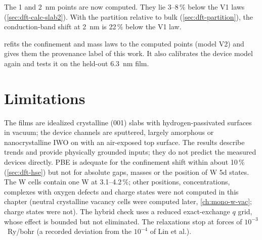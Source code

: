 The 1 and 2~nm points are now computed. They lie 3--8\,\% below the V1 laws (\cref{sec:dft-calc-slab2}). With the
partition relative to bulk (\cref{sec:dft-partition}), the conduction-band shift at 2~nm is 22\,\% below the V1 law.

 refits the confinement and mass laws to the computed points (model V2) and gives them the provenance label
of this work. It also calibrates the device model again and tests it on the held-out 6.3~nm film.

\section{Limitations}
\label{sec:dft-limits}

\begin{caveat}
The films are idealized crystalline (001) slabs with hydrogen-passivated surfaces in vacuum; the device channels are
sputtered, largely amorphous or nanocrystalline IWO on \AlO{} with an air-exposed top surface. The results describe
trends and provide physically grounded inputs; they do not predict the measured devices directly. PBE is adequate for
the confinement shift within about 10\,\% (\cref{sec:dft-hse}) but not for absolute gaps, masses or the position of W 5d
states. The W cells contain one W at 3.1--4.2\,\%; other positions, concentrations, complexes with oxygen defects and
charge states were not computed in this chapter (neutral crystalline vacancy cells were computed later,
\cref{ch:mono-w-vac}; charge states were not). The hybrid check uses a reduced exact-exchange $q$ grid, whose effect is bounded but
not eliminated. The relaxations stop at forces of $10^{-3}$~Ry/bohr (a recorded deviation from the $10^{-4}$ of Lin et
al.).
\end{caveat}

